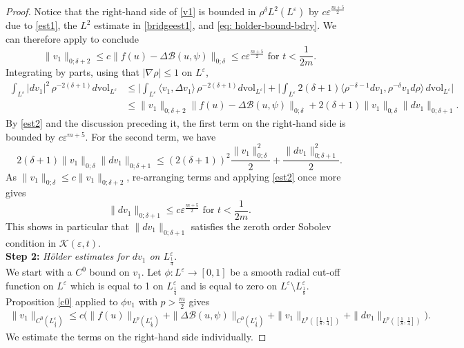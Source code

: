 \documentclass[11pt]{amsart}
\theoremstyle{definition}
\theoremstyle{remark}
\newcommand{\vol}{\mathrm{vol}}
\begin{document}
\begin{proof}
    Notice that the right-hand side of \eqref{v1} is bounded in $\rho^{\delta} L^{2}(L^\varepsilon)$ by $c \varepsilon^{\frac{m+5}{2}}$ due to \eqref{est1}, the $L^2$ estimate in \eqref{bridgeest1}, and \eqref{eq: holder-bound-bdry}. We can therefore apply \cite[Lemma 4.1]{Sm93} to conclude 
    \begin{equation}
        \|v_1\|_{0;\delta+2} \leq c\lVert f(u) - \Delta \mathcal{B}(u,\psi)\rVert_{0;\delta}\leq  c \varepsilon^{\frac{m+5}{2} } \text{ for } t < \frac{1}{2m}. \label{est2}
    \end{equation}
    Integrating by parts, using that $|\nabla \rho| \leq 1$ on $L^\varepsilon$, 
    \begin{align*}
        \int_{L^\varepsilon} | d v_1|^2 \, \rho^{-2(\delta+1)}d\vol_{L^\varepsilon} &\leq \Big| \int_{L^\varepsilon} \langle v_1, \Delta v_1 \rangle \, \rho^{-2(\delta+1)} d\vol_{L^\varepsilon} \Big| + \Big|\int_{L^\varepsilon} 2(\delta+1)\langle \rho^{-\delta-1}dv_1, \rho^{-\delta}v_1 d\rho\rangle \, d\vol_{L^\varepsilon} \Big| \\
        &\leq \|v_1\|_{0;\delta+2}\|f(u)-\Delta\mathcal{B}(u,\psi)\|_{0;\delta} + 2(\delta+1)\|v_1\|_{0;\delta}\|dv_1\|_{0;\delta+1}.
    \end{align*}
    By \eqref{est2} and the discussion preceding it, the first term on the right-hand side is bounded by $c\varepsilon^{m+5}$. For the second term, we have
    \[2(\delta+1)\|v_1\|_{0;\delta}\|dv_1\|_{0;\delta+1} \leq (2(\delta+1))^2\frac{\|v_1\|_{0;\delta}^2}{2} + \frac{\|dv_1\|_{0;\delta+1}^2}{2}.\]
    As $\lVert v_1\rVert_{0;\delta}\leq c \lVert v_1\rVert_{0;\delta+2}$,
    re-arranging terms and applying \eqref{est2} once more gives
    \begin{equation}
        \|dv_1\|_{0; \delta +1} \leq c \varepsilon^{\frac{m+5}{2}  } \text{ for } t <  \frac{1}{2m}. \label{est3}
    \end{equation}
    This shows in particular that $\lVert dv_1\rVert_{0;\delta+1}$ satisfies the zeroth order Sobolev condition in $\mathscr{K}(\varepsilon,t)$. \\
    
    \noindent
    \textbf{Step 2:} \emph{H\"older estimates for $dv_1$ on $L_{\frac{1}{4}}^\varepsilon$}. \\
    
    We start with a $C^0$ bound on $v_1$. Let $\phi: L^{\varepsilon} \rightarrow [0,1]$ be a smooth radial cut-off function on $L^\varepsilon$ which is equal to 1 on $L_{\frac{1}{4}}^\varepsilon$ and is equal to zero on $L^\varepsilon \setminus L_{\frac{1}{8}}^\varepsilon$. 
    Proposition \ref{c0} applied to $\phi v_1$ with $p > \frac{m}{2}$ gives
    \begin{align}
        \|v_1\|_{C^0(L_{\frac{1}{4}}^\varepsilon)} \leq c\big(\|f(u)\|_{L^p(L_{\frac{1}{8}}^\varepsilon)} + \|\Delta \mathcal{B}(u,\psi)\|_{C^0(L_{\frac{1}{8}}^\varepsilon)} + \|v_1\|_{L^p([\frac{1}{8},\frac{1}{4}])} + \|dv_1\|_{L^p([\frac{1}{8},\frac{1}{4}])} \big). \label{est5}
    \end{align}
We estimate the terms on the right-hand side individually. 


\end{proof}
\end{document}
